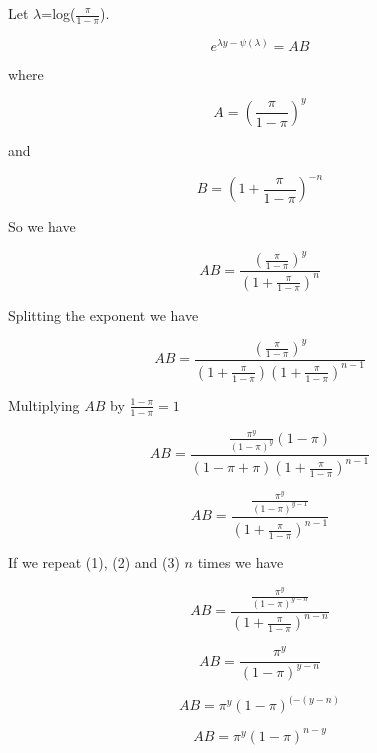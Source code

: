 \documentclass[12pt]{amsart}
\title{}
\author{}
\date{} %
\begin{document}
\maketitle

Let $\lambda$=log($\frac{\pi}{1-\pi}$). 

$$
e^{\lambda y - \psi(\lambda)} = AB 
$$

where 

$$
A = {(\frac{\pi}{1-\pi})}^y
$$

and 

$$
B = (1 + \frac{\pi}{1-\pi})^{-n}
$$

So we have 

$$
AB = \frac{{(\frac{\pi}{1-\pi})}^y }{ (1 + \frac{\pi}{1-\pi})^{n}}
$$

Splitting the exponent we have

\begin{equation}
AB = \frac{{(\frac{\pi}{1-\pi})}^y }{ (1 + \frac{\pi}{1-\pi})(1 + \frac{\pi}{1-\pi})^{n-1}} 
\end{equation}

Multiplying $AB$ by $\frac{1-\pi}{1-\pi}=1$

\begin{equation}
AB = \frac{{\frac{\pi^y}{(1-\pi)^y}} (1-\pi)}{ ({1-\pi} + \pi)(1 + \frac{\pi}{1-\pi})^{n-1}}
\end{equation}

\begin{equation}
AB = \frac{{\frac{\pi^y}{(1-\pi)^{y-1}}}}{(1 + \frac{\pi}{1-\pi})^{n-1}}
\end{equation}

If we repeat (1), (2) and (3) $n$ times we have 

$$
AB = \frac{{\frac{\pi^y}{(1-\pi)^{y-n}}}}{(1 + \frac{\pi}{1-\pi})^{n-n}}
$$

$$
AB = {\frac{\pi^y}{(1-\pi)^{y-n}}}
$$

$$
AB = \pi^y (1-\pi)^{(-(y-n)}
$$

$$
AB = \pi^y (1-\pi)^{n-y}
$$
\end{document}
